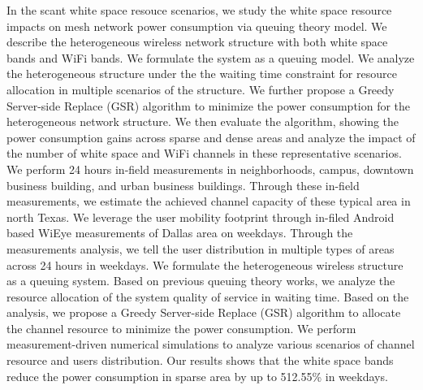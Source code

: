 In the scant white space resouce scenarios, we study the white space resource impacts on 
mesh network power consumption via queuing theory model.
We describe the heterogeneous wireless network structure with both white space bands and WiFi bands. 
We formulate the system as a queuing model. We analyze the heterogeneous structure under the the waiting 
time constraint for resource allocation in multiple scenarios of the structure. We further propose a Greedy 
Server-side Replace (GSR) algorithm to minimize the power consumption for the heterogeneous network structure. 
We then evaluate the algorithm, showing the power consumption gains across sparse and dense areas and 
analyze the impact of the number of white space and WiFi channels in these representative scenarios.
We perform 24 hours in-field measurements in neighborhoods, campus, downtown business building, 
and urban business buildings. Through these in-field measurements, we estimate the achieved channel capacity of 
these typical area in north Texas.
We leverage the user mobility footprint through in-filed Android based WiEye measurements of Dallas area on weekdays. 
Through the measurements analysis, we tell the user distribution in multiple types of areas across 24 hours in weekdays. 
We formulate the heterogeneous wireless structure as a queuing system. Based on previous queuing theory works, we 
analyze the resource allocation of the system quality of service in waiting time. Based on the analysis, we propose a 
Greedy Server-side Replace (GSR) algorithm to allocate the channel resource to minimize the power consumption.
We perform measurement-driven numerical simulations to analyze various scenarios of channel resource and 
users distribution. Our results shows that the white space bands reduce the power consumption in
sparse area by up to 512.55\% in weekdays.






